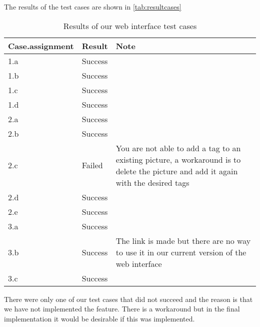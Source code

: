 The results of the test cases are shown in \autoref{tab:resultcases}

\begin{table}[H]
	\centering
	\begin{tabular}{|l|l|p{7cm}|}
		\hline
		Case.assignment & Result & Note \\ \hline \hline
		1.a & Success & \\ \hline
		1.b & Success &\\ \hline
		1.c & Success&\\ \hline
		1.d & Success &\\ \hline
		2.a & Success &\\ \hline
		2.b & Success &\\ \hline
		2.c & Failed & You are not able to add a tag to an existing picture, a workaround is to delete the picture and add it again with the desired tags\\ \hline
		2.d & Success &\\ \hline
		2.e & Success &\\ \hline
		3.a & Success &\\ \hline
		3.b & Success & The link is made but there are no way to use it in our current version of the web interface\\ \hline
		3.c & Success &\\ \hline
	\end{tabular}
	\caption{Results of our web interface test cases}
	\label{tab:resultcases}
\end{table}

There were only one of our test cases that did not succeed and the reason is that we have not implemented the feature. There is a workaround but in the final implementation it would be desirable if this was implemented.
